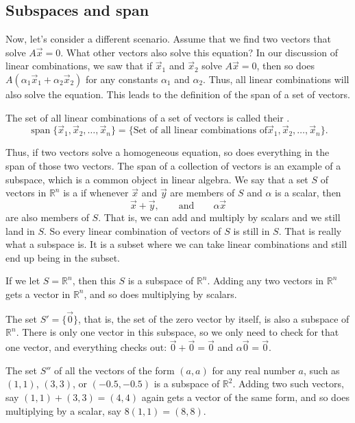 \subsection{Subspaces and span}

Now, let's consider a different scenario. Assume that we find two vectors that solve $A\vec{x} = 0$. What other vectors also solve this equation? In our discussion of linear combinations, we saw that if $\vec{x}_1$ and $\vec{x}_2$ solve $A\vec{x} = 0$, then so does $A(\alpha_1\vec{x}_1 + \alpha_2\vec{x}_2)$ for any constants $\alpha_1$ and $\alpha_2$. Thus, all linear combinations will also solve the equation. This leads to the definition of the span of a set of vectors.

\begin{definition}
The set of all linear combinations of a set of vectors is called their
\emph{}.
\begin{equation*}
\operatorname{span} \bigl\{ \vec{x}_1, \vec{x}_2 , \ldots , \vec{x}_n \bigr\}
=
\bigl\{
\text{Set of all linear combinations of
$\vec{x}_1, \vec{x}_2 , \ldots , \vec{x}_n$}
\bigr\} .
\end{equation*}
\end{definition}

Thus, if two vectors solve a homogeneous equation, so does everything in the span of those two vectors. The span of a collection of vectors is an example of a subspace, which is a common object in linear algebra. We say that a set $S$ of vectors in ${\mathbb R}^n$ is a
\emph{} if
whenever $\vec{x}$ and $\vec{y}$ are members of $S$ and
$\alpha$ is a scalar, then
\begin{equation*}
\vec{x} + \vec{y}, \qquad \text{and} \qquad \alpha \vec{x}
\end{equation*}
are also members of $S$.  That is, we can add and multiply by scalars
and we still land in $S$.  So every linear combination of vectors of
$S$ is still in $S$.  That is really what a subspace is.  It is a subset
where we can take linear combinations and still end up being in the subset.

\begin{example} \label{example:simplesubspaces}
If we let $S = {\mathbb R}^n$, then this $S$ is a subspace of
${\mathbb R}^n$.  Adding any two vectors in ${\mathbb R}^n$ gets a vector in
${\mathbb R}^n$, and so does multiplying by scalars.

The set $S' = \{ \vec{0} \}$, that is,
the set of the zero vector by itself, is 
also a subspace of ${\mathbb R}^n$.  There is only one vector in this
subspace, so we only need to check for that one vector, and everything checks
out: $\vec{0}+\vec{0} = \vec{0}$ and $\alpha \vec{0} = \vec{0}$.

The set $S''$ of all the vectors of the form
$(a,a)$ for any real number $a$, such as $(1,1)$, $(3,3)$, or $(-0.5,-0.5)$
is a subspace of ${\mathbb R}^2$.  Adding two such vectors, say
$(1,1)+(3,3) = (4,4)$ again gets a vector of the same form, and so does
multiplying by a scalar, say $8(1,1) = (8,8)$.
\end{example}

